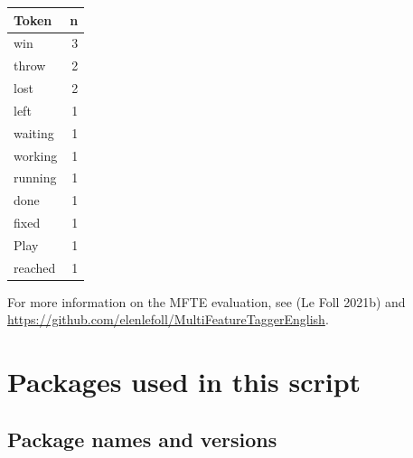\documentclass[
  letterpaper,
  DIV=11,
  numbers=noendperiod]{scrreprt}
\begin{document}
\begin{longtable}[]{@{}lr@{}}
\toprule\noalign{}
Token & n \\
\midrule\noalign{}
\endhead
\bottomrule\noalign{}
\endlastfoot
win & 3 \\
throw & 2 \\
lost & 2 \\
left & 1 \\
waiting & 1 \\
working & 1 \\
running & 1 \\
done & 1 \\
fixed & 1 \\
Play & 1 \\
reached & 1 \\
\end{longtable}

For more information on the MFTE evaluation, see (Le Foll 2021b) and
\url{https://github.com/elenlefoll/MultiFeatureTaggerEnglish}.

\section{Packages used in this
script}\label{packages-used-in-this-script}

\subsection{Package names and
versions}\label{package-names-and-versions}
\end{document}
